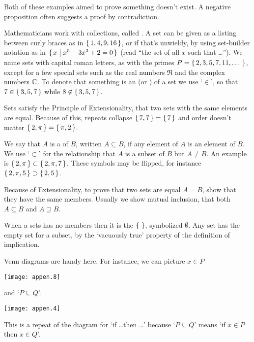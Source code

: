 Both of these examples aimed to prove something doesn't exist.
A negative proposition often suggests a proof by contradiction.














Mathematicians work with collections, called . 
A set can be given as a listing between curly braces as in
\( \mbox{$\{\, 1,4,9,16 \,\}$} \), or if that's
unwieldy, by using set-builder notation as in
\( \mbox{$\{\,x\bigm| x^5-3x^3+2=0 \,\}$} \) (read ``the set of all \( x \)
such that \ldots'').
We name sets with capital roman letters, as with the primes
\( P=\mbox{$\{\,2,3,5,7,11,\ldots\,\,\}$} \), except for a few special sets such as the
real numbers \( \Re \)
and the complex numbers \( \mathbb{C} \).
To denote that something is an 
(or ) of a set we
use `\(\in \)',
so that \( 7\in\mbox{$\{\,3,5,7\,\}$} \) while \( 8\not\in\mbox{$\{\,3,5,7\,\}$} \).

Sets satisfy
the Principle of Extensionality, that two sets with the same elements
are equal.
Because of this, 
repeats collapse \( \mbox{$\{\,7,7\,\}$}=\mbox{$\{\,7\,\}$} \) and order doesn't
matter \( \mbox{$\{\,2,\pi\,\}$}=\mbox{$\{\,\pi,2\,\}$} \).

We say that \( A \) is a  of \( B \), written
$A\subseteq B$, if any element of $A$ is an element of $B$.
We use
`\( \subset \)' for the  %
relationship that \( A \) is a subset of \( B \) but \( A\neq B \).
An example is 
\( \mbox{$\{\,2,\pi\,\}$}\subset\mbox{$\{\,2,\pi,7\,\}$} \).
These symbols may be flipped, for instance
\( \mbox{$\{\, 2,\pi,5\,\}$}\supset\mbox{$\{\,2,5\,\}$} \).

Because of Extensionality, to prove that two sets are equal \( A=B \),
show that they have the same members.
Usually we show mutual inclusion,%
that both \( A\subseteq B \) and \( A\supseteq B \).

When a sets has no members then it is
the  \( \mbox{$\{\,\,\}$} \),
symbolized \( \emptyset \).
Any set has the empty set for a subset, by the `vacuously true'
property of the definition of implication.


Venn diagrams are handy here.
For instance, we can picture \( x\in P \) 
\begin{center}
  \texttt{[image: appen.8]}
\end{center}
and `\( P\subseteq Q \)'.
\begin{center}
  \texttt{[image: appen.4]}
\end{center}
\noindent
This is a repeat of the diagram for `if \ldots then \ldots' 
because `\( P\subseteq Q \)' means 
`if \( x\in P \) then \( x\in Q \)'.

